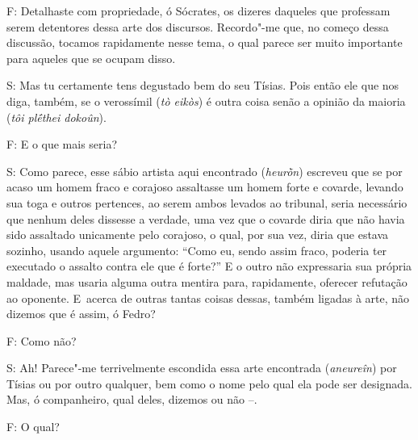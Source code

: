 F: Detalhaste com propriedade, ó Sócrates, os dizeres daqueles que
professam serem detentores dessa arte dos discursos. Recordo"-me que, no
começo dessa discussão, tocamos rapidamente nesse tema, o qual parece
ser muito importante para aqueles que se ocupam disso.

 

S: Mas tu certamente tens degustado bem do seu Tísias. \bekker{[273b]} Pois
então ele que nos diga, também, se o verossímil (\emph{tò eikòs}) é
outra coisa senão a opinião da maioria (\emph{tôi plḗthei dokoûn}).

F: E o que mais seria?

 

S: Como parece, esse sábio artista aqui encontrado (\emph{heurṑn})
escreveu que se por acaso um homem fraco e corajoso assaltasse um
homem forte e covarde, levando sua toga e outros pertences, ao serem
ambos levados ao tribunal, seria necessário que nenhum deles dissesse a
verdade, uma vez que o covarde diria que não havia sido assaltado
unicamente pelo corajoso, o qual, por sua vez, diria que estava sozinho,
\bekker{[273c]} usando aquele argumento: ``Como eu, sendo assim fraco,
poderia ter executado o assalto contra ele que é forte?'' E o outro não
expressaria sua própria maldade, mas usaria alguma outra mentira para,
rapidamente, oferecer refutação ao oponente. E~acerca de outras tantas
coisas dessas, também ligadas à arte, não dizemos que é assim, ó Fedro?

 

F: Como não?

 

S: Ah! Parece"-me terrivelmente escondida essa arte encontrada
(\emph{aneureîn}) por Tísias ou por outro qualquer, bem como o nome pelo
qual ela pode ser designada. Mas, ó companheiro, qual deles, dizemos ou
não --.

 

\bekker{[273d]} F: O qual?

 

